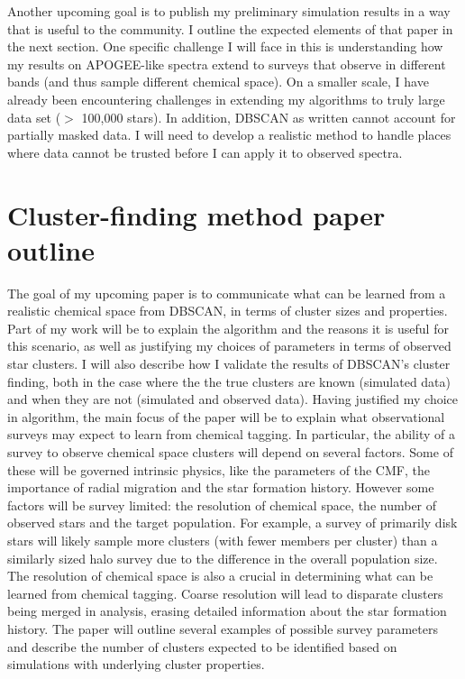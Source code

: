\documentclass[11pt]{article}
\begin{document}
    Another upcoming goal is to publish my preliminary simulation results in a way that is useful to the community. I outline the expected elements of that paper in the next section. One specific challenge I will face in this is understanding how my results on APOGEE-like spectra extend to surveys that observe in different bands (and thus sample different chemical space). On a smaller scale, I have already been encountering challenges in extending my algorithms to truly large data set ($>$ 100,000 stars). In addition, DBSCAN as written cannot account for partially masked data. I will need to develop a realistic method to handle places where data cannot be trusted before I can apply it to observed spectra.
   
 
\section*{Cluster-finding method paper outline}

The goal of my upcoming paper is to communicate what can be learned from a realistic chemical space from DBSCAN, in terms of cluster sizes and properties. Part of my work will be to explain the algorithm and the reasons it is useful for this scenario, as well as justifying my choices of parameters in terms of observed star clusters. I will also describe how I validate the results of DBSCAN's cluster finding, both in the case where the the true clusters are known (simulated data) and when they are not (simulated and observed data). Having justified my choice in algorithm, the main focus of the paper will be to explain what observational surveys may expect to learn from chemical tagging. In particular, the ability of a survey to observe chemical space clusters will depend on several factors. Some of these will be governed intrinsic physics, like the parameters of the CMF, the importance of radial migration and the star formation history. However some factors will be survey limited: the resolution of chemical space, the number of observed stars and the target population. For example, a survey of primarily disk stars will likely sample more clusters (with fewer members per cluster) than a similarly sized halo survey due to the difference in the overall population size. The resolution of chemical space is also a crucial in determining what can be learned from chemical tagging. Coarse resolution will lead to disparate clusters being merged in analysis, erasing detailed information about the star formation history. The paper will outline several examples of possible survey parameters and describe the number of clusters expected to be identified based on simulations with underlying cluster properties.
\end{document}

